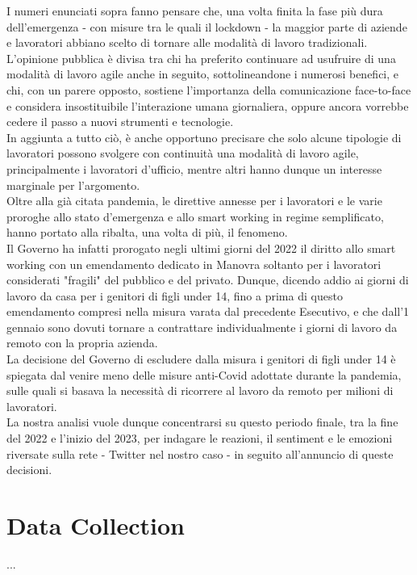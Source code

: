 \documentclass[12pt,journal,compsoc]{IEEEtran}
\begin{document}
I numeri enunciati sopra fanno pensare che, una volta finita la fase più dura dell'emergenza - con misure tra le quali il lockdown - la maggior parte di aziende e lavoratori abbiano scelto di tornare alle modalità di lavoro tradizionali.\\
L'opinione pubblica è divisa tra chi ha preferito continuare ad usufruire di una modalità di lavoro agile anche in seguito, sottolineandone i numerosi benefici, e chi, con un parere opposto, sostiene l'importanza della comunicazione face-to-face e considera insostituibile l'interazione umana giornaliera, oppure ancora vorrebbe cedere il passo a nuovi strumenti e tecnologie.\\
In aggiunta a tutto ciò, è anche opportuno precisare che solo alcune tipologie di lavoratori possono svolgere con continuità una modalità di lavoro agile, principalmente i lavoratori d'ufficio, mentre altri hanno dunque un interesse marginale per l'argomento.\\
Oltre alla già citata pandemia, le direttive annesse per i lavoratori e le varie proroghe allo stato d'emergenza e allo smart working in regime semplificato, hanno portato alla ribalta, una volta di più, il fenomeno.\\
Il Governo ha infatti prorogato negli ultimi giorni del 2022 il diritto allo smart working con un emendamento dedicato in Manovra soltanto per i lavoratori considerati "fragili" del pubblico e del privato. Dunque, dicendo addio ai giorni di lavoro da casa per i genitori di figli under 14, fino a prima di questo emendamento compresi nella misura varata dal precedente Esecutivo, e che dall’1 gennaio sono dovuti tornare a contrattare individualmente i giorni di lavoro da remoto con la propria azienda.\\
La decisione del Governo di escludere dalla misura i genitori di figli under 14 è spiegata dal venire meno delle misure anti-Covid adottate durante la pandemia, sulle quali si basava la necessità di ricorrere al lavoro da remoto per milioni di lavoratori.\\
La nostra analisi vuole dunque concentrarsi su questo periodo finale, tra la fine del 2022 e l'inizio del 2023, per indagare le reazioni, il sentiment e le emozioni riversate sulla rete - Twitter nel nostro caso - in seguito all'annuncio di queste decisioni.

\section{Data Collection}
...
\end{document}
